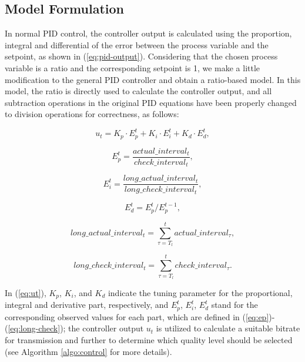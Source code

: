 \documentclass[journal]{IEEEtran}
\begin{document}
\subsection{Model Formulation}
\label{subsec:model-formulation}

In normal PID control, the controller output is calculated using the proportion, integral and differential of the error between the process variable and the setpoint, as shown in (\ref{eq:pid-output}). Considering that the chosen process variable is a ratio and the corresponding setpoint is 1, we make a little modification to the general PID controller and obtain a ratio-based model. In this model, the ratio is directly used to calculate the controller output, and all subtraction operations in the original PID equations have been properly changed to division operations for correctness, as follows:

\begin{equation}
\label{eq:ut}
{u_t} = {K_p} \cdot E_p^t + {K_i} \cdot E_i^t + {K_d} \cdot E_d^t ,
\end{equation}

\begin{equation}
\label{eq:ep}
E_p^t = \frac{{actual\_interva{l_t}}}{{check\_interva{l_t}}} ,
\end{equation}

\begin{equation}
\label{eq:ei}
E_i^t = \frac{{long\_actual\_interva{l_t}}}{{long\_check\_interva{l_t}}} ,
\end{equation}

\begin{equation}
\label{eq:ed}
E_d^t = E_p^t/E_p^{t - 1} ,
\end{equation}

\begin{equation}
\label{eq:long-actual}
long\_actual\_interva{l_t} = \sum\limits_{\tau = {T_l}}^t {actual\_interva{l_\tau}} ,
\end{equation}

\begin{equation}
\label{eq:long-check}
long\_check\_interva{l_t} = \sum\limits_{\tau = {T_l}}^t {check\_interva{l_\tau}} .
\end{equation}


In (\ref{eq:ut}), $K_p$, $K_i$, and $K_d$ indicate the tuning parameter for the proportional, integral and derivative part, respectively, and $E_p^t$, $E_i^t$, $E_d^t$ stand for the corresponding observed values for each part, which are defined in (\ref{eq:ep})-(\ref{eq:long-check}); the controller output $u_t$ is utilized to calculate a suitable bitrate for transmission and further to determine which quality level should be selected (see Algorithm \ref{algo:control} for more details).
\end{document}
